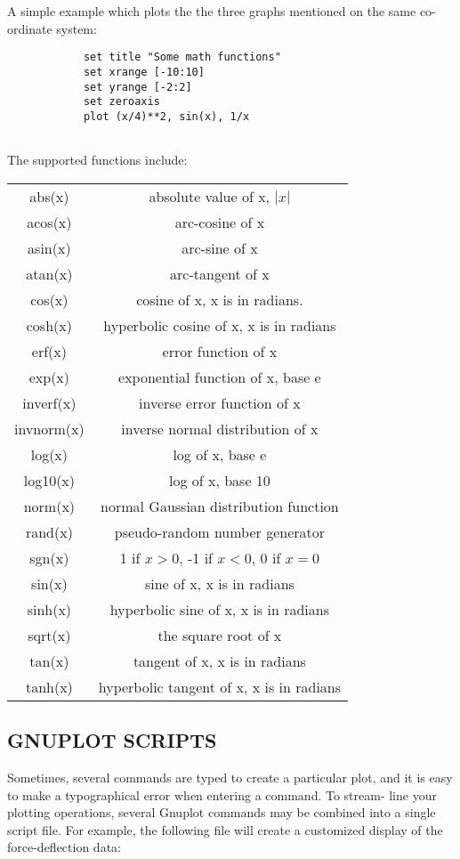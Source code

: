 		A simple example which plots the the three graphs mentioned on the same co-ordinate system:
		\begin{verbatim}
			set title "Some math functions"
			set xrange [-10:10]
			set yrange [-2:2]
			set zeroaxis
			plot (x/4)**2, sin(x), 1/x
			
		\end{verbatim}
		The supported functions include: 
		\begin{center}
			\begin{tabular}{ c c }
			      abs(x)      &      absolute value of x, $|x|$\\
			      acos(x)     &    arc-cosine  of x\\
			      asin(x)     &      arc-sine    of x\\  
			      atan(x)     &      arc-tangent of x\\
			      cos(x)      &      cosine      of x,  x is in radians.\\
			      cosh(x)     &      hyperbolic cosine of x, x is in radians\\
			      erf(x)      &      error function of x\\
			      exp(x)      &      exponential function of x, base e\\
			      inverf(x)   &      inverse error function of x\\
			      invnorm(x)  &      inverse normal distribution of x\\
			      log(x)      &      log of x, base e\\
			      log10(x)    &      log of x, base 10\\
			      norm(x)     &      normal Gaussian distribution function\\
			      rand(x)     &      pseudo-random number generator      \\
			      sgn(x)      &      1 if $x > 0$, -1 if $x < 0$, 0 if $x=0$\\
			      sin(x)      &      sine      of x, x is in radians\\
			      sinh(x)     &      hyperbolic sine of x, x is in radians\\
			      sqrt(x)     &      the square root of x\\
			      tan(x)      &      tangent of x, x is in radians\\
			      tanh(x)     &      hyperbolic tangent of x, x is in radians  
			    \end{tabular}
			\end{center}
\subsection{GNUPLOT SCRIPTS }  
Sometimes, several commands are typed to create a particular plot, and it is easy to make a typographical error when entering a command. To stream- line your plotting operations, several Gnuplot commands may be combined into a single script file. For example, the following file will create a customized display of the force-deflection data:
	 
